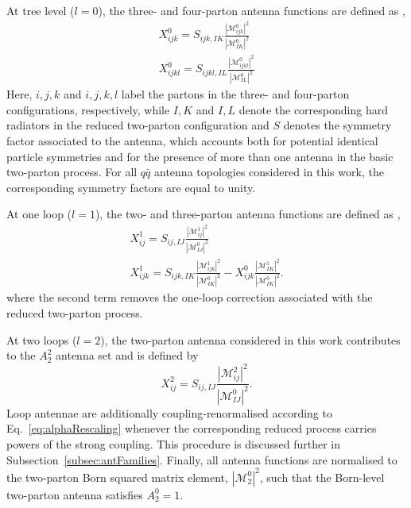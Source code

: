 At tree level ($l=0$), the three- and four-parton antenna functions are
defined as \cite{Gehrmann-DeRidder:2005btv},
\begin{equation}\label{eq:treeAntennaDef}
    \begin{gathered}
        X_{ijk}^0 = S_{ijk, IK}\frac{|\mathcal M_{ijk}^0|^2}{|\mathcal M_{IK}^0|^2}\\
        X_{ijkl}^0 = S_{ijkl, IL}\frac{|\mathcal M_{ijkl}^0|^2}{|\mathcal M_{IL}^0|^2}
    \end{gathered}
\end{equation}
Here, $i,j,k$ and $i,j,k,l$ label the partons in the three- and four-parton
configurations, respectively, while $I,K$ and $I,L$ denote the corresponding
hard radiators in the reduced two-parton configuration and $S$ denotes the
symmetry factor associated to the antenna, which accounts both for potential
identical particle symmetries and for the presence of more than one antenna in
the basic two-parton process. For all $q\bar q$ antenna topologies considered
in this work, the corresponding symmetry factors are equal to unity.

At one loop ($l=1$), the two- and three-parton antenna functions are defined
as \cite{Gehrmann-DeRidder:2005btv},
\begin{equation}\label{eq:oneLoopAntennaDef}
    \begin{gathered}
        X_{ij}^1 = S_{ij,IJ}\frac{|\mathcal M_{ij}^1|^2}{|\mathcal M_{IJ}^0|^2}\\
        X_{ijk}^1 = S_{ijk,IK}\frac{|\mathcal M_{ijk}^1|^2}{|\mathcal M_{IK}^0|^2} - X_{ijk}^0\frac{|\mathcal M_{IK}^1|^2}{|\mathcal M_{IK}^0|^2}.
    \end{gathered}
\end{equation}
where the second term removes the one-loop correction associated with the
reduced two-parton process.

At two loops ($l=2$), the two-parton antenna considered in this work
contributes to the $A_2^2$ antenna set and is defined by
\begin{equation}\label{eq:twoLoopAntennaDef}
    X_{ij}^2 = S_{ij,IJ}\frac{|\mathcal M_{ij}^2|^2}{|\mathcal M_{IJ}^0|^2}.
\end{equation}
Loop antennae are additionally coupling-renormalised according to
Eq.~\eqref{eq:alphaRescaling} whenever the corresponding reduced process carries
powers of the strong coupling. This procedure is discussed further in
Subsection~\ref{subsec:antFamilies}. Finally, all antenna functions are
normalised to the two-parton Born squared matrix element, $|\mathcal M_2^0|^2$,
such that the Born-level two-parton antenna satisfies $A_2^0=1$.

